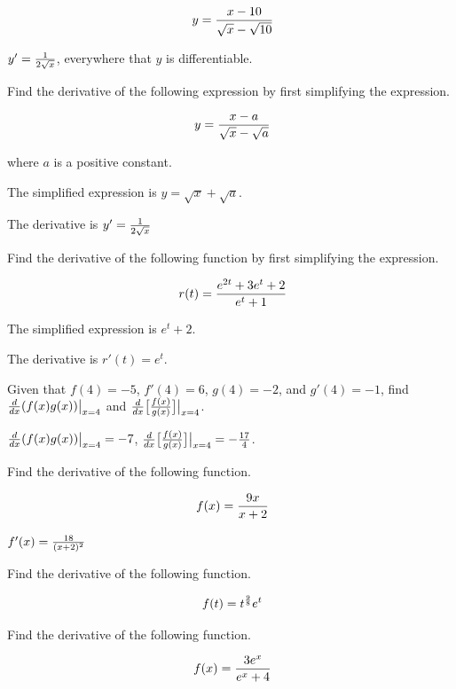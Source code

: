 $$\
y = {x - 10 \over \sqrt{x} - \sqrt{10}}
$$

$y' = {1 \over 2 \sqrt{x}}$, everywhere that $y$ is
differentiable.

\bigskip

Find the derivative of the following expression by first
simplifying the expression.

$$\
y = {x - a \over \sqrt{x} - \sqrt{a}}
$$

where $a$ is a positive constant.


\par The simplified expression is $y = \sqrt{x} + \sqrt{a}$.

\par The derivative is $y' = {1 \over 2 \sqrt{x}}$

\bigskip

Find the derivative of the following function by first
simplifying the expression.

$$\
r(t) = {e^{2t} + 3e^{t} + 2 \over e^t + 1}
$$

\par The simplified expression is $e^t + 2$.

\par The derivative is $r'(t) = e^t$.

\bigskip
{}
\bigskip
{}
\bigskip

Given that $f(4) = -5$, $f'(4) = 6$, $g(4)=-2$, and $g'(4) = -1$,
find ${d \over dx}(f(x)g(x))\big|_{x = 4}$ and
${d \over dx}\big[{f(x) \over g(x)}\big]\big|_{x = 4}$.

\solution{3.4.15}
${d \over dx}(f(x)g(x))\big|_{x = 4} = -7$,
${d \over dx}\big[{f(x) \over g(x)}\big]\big|_{x = 4}
= -{17 \over 4}$.
\bigskip

Find the derivative of the following function.

$$\
f(x) = {9x \over x + 2}
$$

$f'(x) = {18 \over (x + 2)^2}$
\bigskip

Find the derivative of the following function.

$$\
f(t) = t^{9\over 8} e^t
$$

Find the derivative of the following function.

$$\
f(x) = {3e^x \over e^x + 4}
$$

